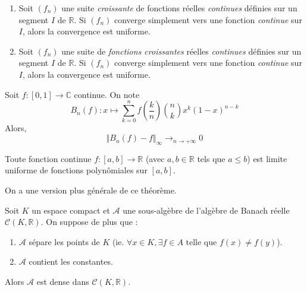 
  \begin{theorem}
    \begin{enumerate}[label=(\roman*)]
      \item Soit $(f_n)$ une suite \textit{croissante} de fonctions réelles \textit{continues} définies sur un segment $I$ de $\mathbb{R}$. Si $(f_n)$ converge simplement vers une fonction \textit{continue} sur $I$, alors la convergence est uniforme.
      \item Soit $(f_n)$ une suite de \textit{fonctions croissantes} réelles \textit{continues} définies sur un segment $I$ de $\mathbb{R}$. Si $(f_n)$ converge simplement vers une fonction \textit{continue} sur $I$, alors la convergence est uniforme.
    \end{enumerate}
  \end{theorem}


  \begin{theorem}[Bernstein]
    Soit $f : [0,1] \rightarrow \mathbb{C}$ continue. On note
    \[ B_n(f) : x \mapsto \sum_{k=0}^{n} f\left(\frac{k}{n}\right) \binom{n}{k} x^k (1-x)^{n-k} \]
    Alors,
    \[ \Vert B_n(f) - f \Vert_\infty \longrightarrow_{n \rightarrow +\infty} 0 \]
  \end{theorem}


  \begin{corollary}[Weierstrass]
    Toute fonction continue $f : [a,b] \rightarrow \mathbb{R}$ (avec $a, b \in \mathbb{R}$ tels que $a \leq b$) est limite uniforme de fonctions polynômiales sur $[a, b]$.
  \end{corollary}

  On a une version plus générale de ce théorème.


  \begin{theorem}
    Soit $K$ un espace compact et $\mathcal{A}$ une sous-algèbre de l'algèbre de Banach réelle $\mathcal{C}(K, \mathbb{R})$. On suppose de plus que :
    \begin{enumerate}[label=(\roman*)]
      \item $\mathcal{A}$ sépare les points de $K$ (ie. $\forall x \in K, \exists f \in A \text{ telle que } f(x) \neq f(y)$).
      \item $\mathcal{A}$ contient les constantes.
    \end{enumerate}
    Alors $\mathcal{A}$ est dense dans $\mathcal{C}(K, \mathbb{R})$.
  \end{theorem}

